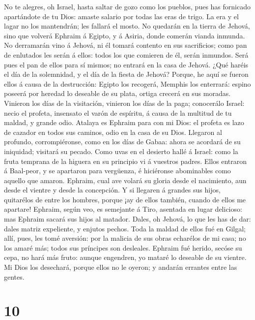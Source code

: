  No te alegres, oh Israel, hasta saltar de gozo como los
pueblos, pues has fornicado apartándote de tu Dios: amaste salario por
todas las eras de trigo.  La era y el lagar no los
mantendrán; les fallará el mosto.  No quedarán en la tierra
de Jehová, sino que volverá Ephraim á Egipto, y á Asiria, donde comerán
vianda inmunda.  No derramarán vino á Jehová, ni él tomará
contento en sus sacrificios; como pan de enlutados les serán á ellos:
todos los que comieren de él, serán inmundos. Será pues el pan de ellos
para sí mismos; no entrará en la casa de Jehová.  ¿Qué
haréis el día de la solemnidad, y el día de la fiesta de Jehová?
 Porque, he aquí se fueron ellos á causa de la destrucción:
Egipto los recogerá, Memphis los enterrará: espino poseerá por heredad
lo deseable de su plata, ortiga crecerá en sus moradas. 
Vinieron los días de la visitación, vinieron los días de la paga;
conocerálo Israel: necio el profeta, insensato el varón de espíritu, á
causa de la multitud de tu maldad, y grande odio.  Atalaya
es Ephraim para con mi Dios: el profeta es lazo de cazador en todos sus
caminos, odio en la casa de su Dios.  Llegaron al profundo,
corrompiéronse, como en los días de Gabaa: ahora se acordará de su
iniquidad; visitará su pecado.  Como uvas en el desierto
hallé á Israel: como la fruta temprana de la higuera en su principio vi
á vuestros padres. Ellos entraron á Baal-peor, y se apartaron para
vergüenza, é hiciéronse abominables como aquello que amaron.
 Ephraim, cual ave volará su gloria desde el nacimiento,
aun desde el vientre y desde la concepción.  Y si llegaren
á grandes sus hijos, quitarélos de entre los hombres, porque ¡ay de
ellos también, cuando de ellos me apartare!  Ephraim, según
veo, es semejante á Tiro, asentada en lugar delicioso: mas Ephraim
sacará sus hijos al matador.  Dales, oh Jehová, lo que les
has de dar: dales matriz expeliente, y enjutos pechos. 
Toda la maldad de ellos fué en Gilgal; allí, pues, les tomé aversión:
por la malicia de sus obras echarélos de mi casa; no los amaré más;
todos sus príncipes son desleales.  Ephraim fué herido,
secóse su cepa, no hará más fruto: aunque engendren, yo mataré lo
deseable de su vientre.  Mi Dios los desechará, porque
ellos no le oyeron; y andarán errantes entre las gentes.

\hypertarget{section-9}{%
\section{10}\label{section-9}}

